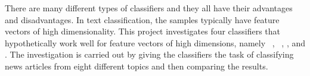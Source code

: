 There are many different types of classifiers and they all have their advantages and disadvantages. In text classification, the samples typically have feature vectors of high dimensionality. This project investigates four classifiers that hypothetically work well for feature vectors of high dimensions, namely \bn\ \nb, \mn\ \nb, \rf, and \svm. The investigation is carried out by giving the classifiers the task of classifying news articles from eight different topics and then comparing the results.
